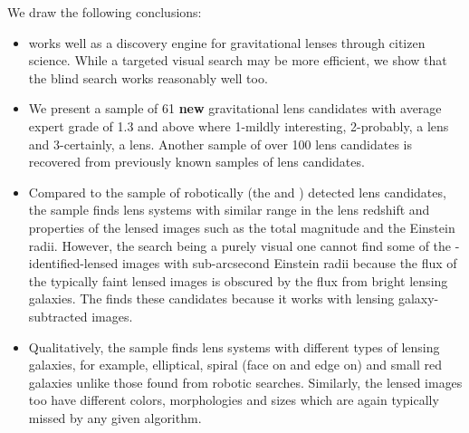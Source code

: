 \documentclass[useAMS,usenatbib,a4paper]{mn2e}
\begin{document}


We draw the following conclusions:
\begin{itemize}

\item \sw works well as a discovery engine for gravitational lenses
through citizen science. While a targeted visual search may be more
efficient, we show that the blind search works reasonably well too.

\item We present a sample of 61 {\bf new} gravitational lens candidates
with average expert grade of 1.3 and above where 1-mildly interesting,
2-probably, a lens and 3-certainly, a lens. Another sample of over 100
lens candidates is recovered from previously known samples of lens
candidates.


\item Compared to the sample of robotically (the \rf and \af) detected
lens candidates, the \sw sample finds lens systems with similar range in
the lens redshift and properties of the lensed images such as the total
magnitude and the Einstein radii. However, the \sw search being a purely
visual one cannot find some of the \rf-identified-lensed images with
sub-arcsecond Einstein radii because the flux of the typically faint
lensed images is obscured by the flux from bright lensing galaxies. The
\rf finds these candidates because it works with lensing
galaxy-subtracted images.

\item Qualitatively, the \sw sample finds lens systems with different
types of lensing galaxies, for example, elliptical, spiral (face on and
edge on) and small red galaxies unlike those found from robotic
searches. Similarly, the lensed images too have different colors,
morphologies and sizes which are again typically missed by any given
algorithm.


\end{itemize}
\end{document}
